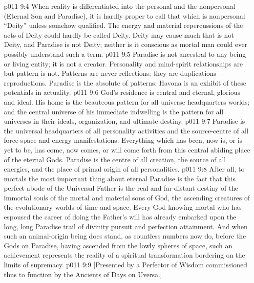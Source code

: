 \vs p011 9:4 When reality is differentiated into the personal and the nonpersonal (Eternal Son and Paradise), it is hardly proper to call that which is nonpersonal “Deity” unless somehow qualified. The energy and material repercussions of the acts of Deity could hardly be called Deity. Deity may cause much that is not Deity, and Paradise is not Deity; neither is it conscious as mortal man could ever possibly understand such a term.
\vs p011 9:5 \pc Paradise is not ancestral to any being or living entity; it is not a creator. Personality and mind\hyp{}spirit relationships are  but pattern is not. Patterns are never reflections; they are duplications --- reproductions. Paradise is the absolute of patterns; Havona is an exhibit of these potentials in actuality.
\vs p011 9:6 \pc God’s residence is central and eternal, glorious and ideal. His home is the beauteous pattern for all universe headquarters worlds; and the central universe of his immediate indwelling is the pattern for all universes in their ideals, organization, and ultimate destiny.
\vs p011 9:7 Paradise is the universal headquarters of all personality activities and the source\hyp{}centre of all force\hyp{}space and energy manifestations. Everything which has been, now is, or is yet to be, has come, now comes, or will come forth from this central abiding place of the eternal Gods. Paradise is the centre of all creation, the source of all energies, and the place of primal origin of all personalities.
\vs p011 9:8 \pc After all, to mortals the most important thing about eternal Paradise is the fact that this perfect abode of the Universal Father is the real and far\hyp{}distant destiny of the immortal souls of the mortal and material sons of God, the ascending creatures of the evolutionary worlds of time and space. Every God\hyp{}knowing mortal who has espoused the career of doing the Father’s will has already embarked upon the long, long Paradise trail of divinity pursuit and perfection attainment. And when such an animal\hyp{}origin being does stand, as countless numbers now do, before the Gods on Paradise, having ascended from the lowly spheres of space, such an achievement represents the reality of a spiritual transformation bordering on the limits of supremacy.
\vsetoff
\vs p011 9:9 [Presented by a Perfector of Wisdom commissioned thus to function by the Ancients of Days on Uversa.]
\quizlink
